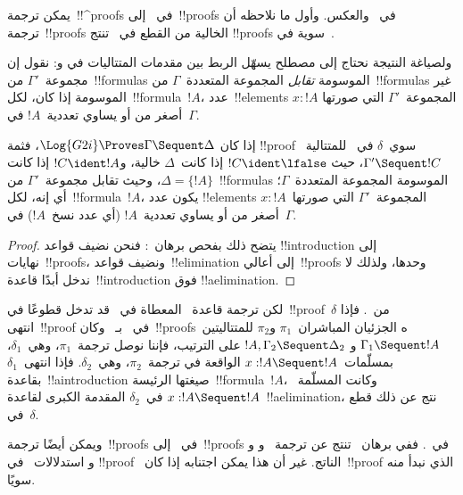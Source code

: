 \documentclass[../../../include/open-logic-section]{subfiles}
\begin{document}


يمكن ترجمة~!!^{proof}s في~ إلى~!!{proof}s في~ والعكس.
وأول ما نلاحظه أن ترجمة~!!{proof}s الخالية من القطع في~ تنتج
!!{proof}s سوية في~.

ولصياغة النتيجة نحتاج إلى مصطلح يسهّل الربط بين مقدمات المتتاليات في
 و: نقول إن مجموعة~$\Gamma'$ من~!!{formula}s الموسومة
\emph{تقابل} المجموعة المتعددة~$\Gamma$ من~!!{formula}s غير الموسومة إذا
كان، لكل~!!{formula}~$!A$، عدد~!!{element}s المجموعة~$\Gamma'$ التي صورتها
$x:!A$ أصغر من أو يساوي تعددية~$!A$ في~$\Gamma$.

\begin{cor}
إذا كان $\Log{G2i} \Proves \Gamma \Sequent \Delta$، فثمة
!!{proof} سوي~$\delta$ في~ للمتتالية~$\Gamma' \Sequent !C$، حيث
$!C\ident\lfalse$ إذا كانت~$\Delta$ خالية، و$!C\ident !A$ إذا كانت
$\Delta=\{!A\}$، وحيث تقابل مجموعة~$\Gamma'$ من~!!{formula}s الموسومة
المجموعة المتعددة~$\Gamma$؛ أي إنه، لكل~!!{formula}~$!A$، يكون عدد
!!{element}s المجموعة~$\Gamma'$ التي صورتها~$x:!A$ أصغر من أو يساوي
تعددية~$!A$ (أي عدد نسخ~$!A$) في~$\Gamma$.
\end{cor}

\begin{proof}
يتضح ذلك بفحص برهان~: فنحن نضيف قواعد
!!{introduction} إلى نهايات~!!{proof}s، ونضيف قواعد~!!{elimination} إلى
أعالي~!!{proof}s وحدها، ولذلك لا ندخل أبدًا قاعدة~!!{introduction} فوق
!!a{elimination}.
\end{proof}

لكن ترجمة قاعدة~\Cut{} المعطاة في~
قد تدخل قطوعًا في~!!{proof}~$\delta$ من~. فإذا انتهى~!!{proof}
في~ بـ~\Cut{} وكان~!!{proof}sه الجزئيان المباشران~$\pi_1$ و$\pi_2$
للمتتاليتين~$\Gamma_1 \Sequent !A$ و
$!A,\Gamma_2 \Sequent \Delta_2$ على الترتيب، فإننا نوصل ترجمة~$\pi_1$،
وهي~$\delta_1$، بمسلّمات~$x:!A \Sequent !A$ الواقعة في ترجمة~$\pi_2$،
وهي~$\delta_2$. فإذا انتهى~$\delta_1$ بقاعدة~!!a{introduction} صيغتها
الرئيسة~!!{formula}~$!A$، وكانت المسلّمة~$x:!A \Sequent !A$ في~$\delta_2$
المقدمة الكبرى لقاعدة~!!a{elimination}، نتج عن ذلك قطع في~$\delta$.

ويمكن أيضًا ترجمة~!!{proof}s في~ إلى~!!{proof}s في~.
ففي برهان~ تنتج عن ترجمة~\Elim{\land} و
\Elim{\lif} و\Elim{\lnot} و\Elim{\lforall} استدلالات~\Cut{} في
!!{proof}~ الناتج. غير أن هذا يمكن اجتنابه إذا كان~!!{proof}
 الذي نبدأ منه سويًا.
\end{document}
